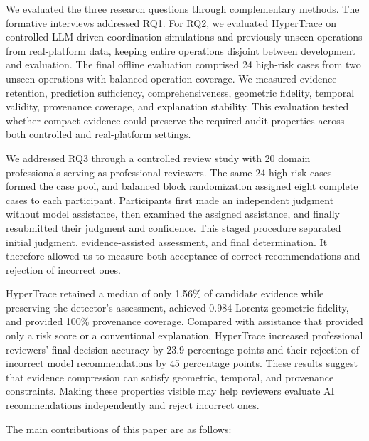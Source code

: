 We evaluated the three research questions through complementary methods. The formative interviews addressed RQ1. For RQ2, we evaluated HyperTrace on controlled LLM-driven coordination simulations and previously unseen operations from real-platform data, keeping entire operations disjoint between development and evaluation. The final offline evaluation comprised 24 high-risk cases from two unseen operations with balanced operation coverage. We measured evidence retention, prediction sufficiency, comprehensiveness, geometric fidelity, temporal validity, provenance coverage, and explanation stability. This evaluation tested whether compact evidence could preserve the required audit properties across both controlled and real-platform settings.

We addressed RQ3 through a controlled review study with 20 domain professionals serving as professional reviewers. The same 24 high-risk cases formed the case pool, and balanced block randomization assigned eight complete cases to each participant. Participants first made an independent judgment without model assistance, then examined the assigned assistance, and finally resubmitted their judgment and confidence. This staged procedure separated initial judgment, evidence-assisted assessment, and final determination. It therefore allowed us to measure both acceptance of correct recommendations and rejection of incorrect ones.

HyperTrace retained a median of only 1.56\% of candidate evidence while preserving the detector's assessment, achieved 0.984 Lorentz geometric fidelity, and provided 100\% provenance coverage. Compared with assistance that provided only a risk score or a conventional explanation, HyperTrace increased professional reviewers' final decision accuracy by 23.9 percentage points and their rejection of incorrect model recommendations by 45 percentage points. These results suggest that evidence compression can satisfy geometric, temporal, and provenance constraints. Making these properties visible may help reviewers evaluate AI recommendations independently and reject incorrect ones.

The main contributions of this paper are as follows:

